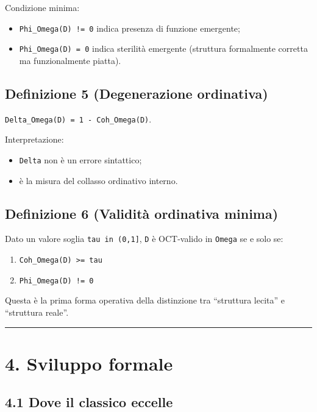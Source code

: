 Condizione minima:

\begin{itemize}
\tightlist
\item
  \texttt{Phi\_Omega(D)\ !=\ 0} indica presenza di funzione emergente;
\item
  \texttt{Phi\_Omega(D)\ =\ 0} indica sterilità emergente (struttura formalmente corretta ma funzionalmente piatta).
\end{itemize}

\subsection{Definizione 5 (Degenerazione ordinativa)}

\texttt{Delta\_Omega(D)\ =\ 1\ -\ Coh\_Omega(D)}.

Interpretazione:

\begin{itemize}
\tightlist
\item
  \texttt{Delta} non è un errore sintattico;
\item
  è la misura del collasso ordinativo interno.
\end{itemize}

\subsection{Definizione 6 (Validità ordinativa minima)}

Dato un valore soglia \texttt{tau\ in\ (0,1{]}}, \texttt{D} è OCT-valido in \texttt{Omega} se e solo se:

\begin{enumerate}
\def\labelenumi{\arabic{enumi}.}
\tightlist
\item
  \texttt{Coh\_Omega(D)\ \textgreater{}=\ tau}
\item
  \texttt{Phi\_Omega(D)\ !=\ 0}
\end{enumerate}

Questa è la prima forma operativa della distinzione tra ``struttura lecita'' e ``struttura reale''.

\begin{center}\rule{0.5\linewidth}{0.5pt}\end{center}

\section{4. Sviluppo formale}

\subsection{4.1 Dove il classico eccelle}


